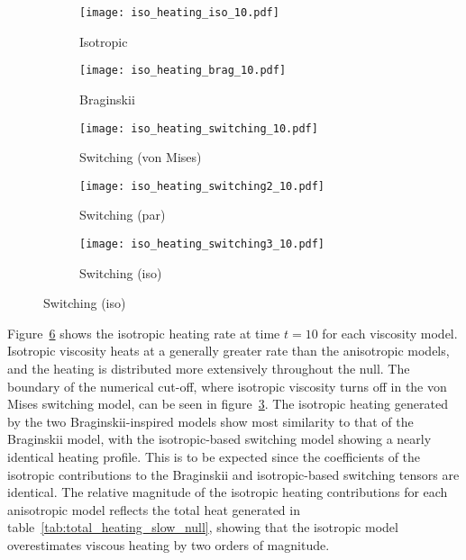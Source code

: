 \begin{figure}[t]
    \centering
    \hfill
    \begin{subfigure}{0.32\textwidth}
      \texttt{[image: iso\_heating\_iso\_10.pdf]}
      \caption{Isotropic}%
      \label{fig:iso_heating_iso_10}
    \end{subfigure}
    \hfill
    \begin{subfigure}{0.32\textwidth}
      \texttt{[image: iso\_heating\_brag\_10.pdf]}
      \caption{Braginskii}%
      \label{fig:iso_heating_brag_10}
    \end{subfigure}
    \hfill
    \begin{subfigure}{0.32\textwidth}
      \texttt{[image: iso\_heating\_switching\_10.pdf]}
      \caption{Switching (von Mises)}%
      \label{fig:iso_heating_switching_10}
    \end{subfigure}
    \begin{subfigure}{0.32\textwidth}
      \texttt{[image: iso\_heating\_switching2\_10.pdf]}
      \caption{Switching (par)}%
      \label{fig:iso_heating_switching2_10}
    \end{subfigure}
    \begin{subfigure}{0.32\textwidth}
      \texttt{[image: iso\_heating\_switching3\_10.pdf]}
      \caption{Switching (iso)}%
      \label{fig:iso_heating_switching3_10}
    \end{subfigure}

\label{fig:isotropic_heating}%
\end{figure}

Figure~\ref{fig:isotropic_heating} shows the isotropic heating rate at time $t=10$ for each viscosity model. Isotropic viscosity heats at a generally greater rate than the anisotropic models, and the heating is distributed more extensively throughout the null. The boundary of the numerical cut-off, where isotropic viscosity turns off in the von Mises switching model, can be seen in figure~\ref{fig:iso_heating_switching_10}. The isotropic heating generated by the two Braginskii-inspired models show most similarity to that of the Braginskii model, with the isotropic-based switching model showing a nearly identical heating profile. This is to be expected since the coefficients of the isotropic contributions to the Braginskii and isotropic-based switching tensors are identical. The relative magnitude of the isotropic heating contributions for each anisotropic model reflects the total heat generated in table~\ref{tab:total_heating_slow_null}, showing that the isotropic model overestimates viscous heating by two orders of magnitude.


